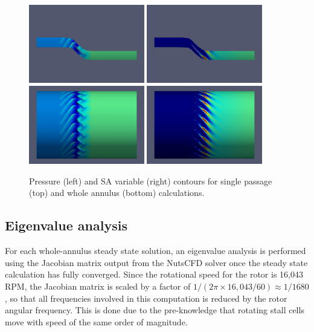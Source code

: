 \documentclass[journal,final]{new-aiaa}
\begin{document}
\begin{figure}[htb]
	\centering   
	\includegraphics[width=0.45\textwidth]{pic/pressure-1passage.jpeg}
	\includegraphics[width=0.45\textwidth]{pic/sa-1passage.jpeg}\\    \includegraphics[width=0.45\textwidth]{pic/pressure-22passage.jpeg}
	\includegraphics[width=0.45\textwidth]{pic/sa-22passage.jpeg}
	\caption{Pressure (left) and SA variable (right) contours for
	single passage (top) and whole annulus (bottom) calculations.}
	\label{fig:r67-flow}
\end{figure}

\subsection{Eigenvalue analysis}

For each whole-annulus steady state solution, an eigenvalue analysis
is performed using the Jacobian matrix output from the NutsCFD solver
once the steady state calculation has fully converged.
Since the rotational speed for the rotor is 16,043 RPM, the Jacobian
matrix is scaled by a factor of $1/(2\pi \times 16,043 / 60)\approx 1/1680$,
so that all frequencies involved in this computation is reduced by the
rotor angular frequency. This is done due to the pre-knowledge that
rotating stall cells move with speed of the same order of magnitude.
\end{document}
